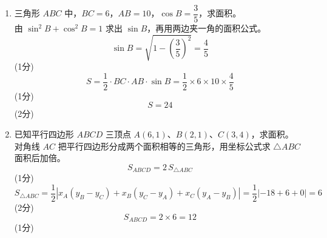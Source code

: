 \documentclass[12pt,a4paper]{exam-zh}
\newcommand{\qscore}[1]{%
    \unskip\nobreak\hfill
    \makebox[0pt][l]{\makebox[4em][r]{(#1\%)}}%
}
\begin{document}
\begin{solution}
    \begin{enumerate}[label=(\alph*)]
        \item 三角形 $ABC$ 中，$BC = 6$，$AB = 10$，$\cos B = \dfrac{3}{5}$，求面积。 \\
        由 $\sin^2 B + \cos^2 B = 1$ 求出 $\sin B$，再用两边夹一角的面积公式。
        \[
            \displaystyle \sin B = \sqrt{1-\left(\frac{3}{5}\right)^2} = \frac{4}{5}
        \] \hfill (1分) \\
        \[
            \displaystyle S = \frac{1}{2}\cdot BC\cdot AB\cdot\sin B = \frac{1}{2}\times 6\times 10\times\frac{4}{5}
        \] \hfill (1分) \\
        \[
            \displaystyle S = 24
        \] \hfill (2分)

        \item 已知平行四边形 $ABCD$ 三顶点 $A(6,1)$、$B(2,1)$、$C(3,4)$，求面积。 \\
        对角线 $AC$ 把平行四边形分成两个面积相等的三角形，用坐标公式求 $\triangle ABC$ 面积后加倍。
        \[
            \displaystyle S_{ABCD} = 2\,S_{\triangle ABC}
        \] \hfill (1分) \\
        \[
            \displaystyle S_{\triangle ABC} = \frac{1}{2}\left|x_A(y_B-y_C)+x_B(y_C-y_A)+x_C(y_A-y_B)\right| = \frac{1}{2}\left|-18+6+0\right| = 6
        \] \hfill (2分) \\
        \[
            \displaystyle S_{ABCD} = 2\times 6 = 12
        \] \hfill (1分)
    \end{enumerate}
\end{solution}

        


\end{document}

